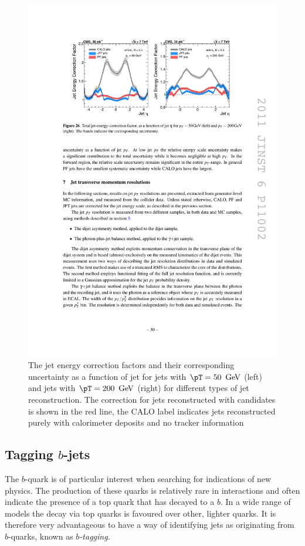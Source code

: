 \begin{figure}
\begin{center}
\includegraphics[width=0.9\linewidth]{figs/reconstruction/jec} \end{center}
\caption{The jet energy correction factors and their corresponding
uncertainty as a function of jet \eta
for jets with $\pT=50~\gev$ (left) and jets with $\pT=200~\gev$
(right) for different types of jet reconstruction. The correction for jets
reconstructed with \PF candidates is shown in the red line, the CALO
label indicates jets reconstructed purely with calorimeter deposits
and no tracker information \cite{1748-0221-6-11-P11002}}
\label{fig:jec} \end{figure}

\subsection{Tagging $b$-jets}

The $b$-quark is of particular interest when searching for
indications of new physics. The production of these
quarks is relatively rare in \SM interactions and often
indicate the presence of a top quark that has decayed to a
$b$. In a wide range of \SUSY models the decay via top quarks is
favoured over other, lighter quarks. It is therefore very advantageous
to have a way of identifying jets as originating from $b$-quarks,
known as \emph{$b$-tagging}.

